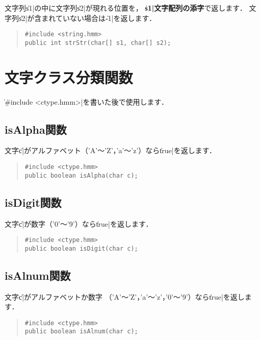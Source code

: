 文字列\|s1|の中に文字列\|s2|が現れる位置を，
{\bf\|s1|文字配列の添字}で返します．
文字列\|s2|が含まれていない場合は\|-1|を返します．

\begin{quote}
\begin{verbatim}
#include <string.hmm>
public int strStr(char[] s1, char[] s2);
\end{verbatim}
\end{quote}

\section{文字クラス分類関数}

\|#include <ctype.hmm>|を書いた後で使用します．

\subsection{isAlpha関数}

文字\|c|がアルファベット（'A'〜'Z'，'a'〜'z'）なら\|true|を返します．

\begin{quote}
\begin{verbatim}
#include <ctype.hmm>
public boolean isAlpha(char c);
\end{verbatim}
\end{quote}

\subsection{isDigit関数}

文字\|c|が数字（'0'〜'9'）なら\|true|を返します．

\begin{quote}
\begin{verbatim}
#include <ctype.hmm>
public boolean isDigit(char c);
\end{verbatim}
\end{quote}

\subsection{isAlnum関数}

文字\|c|がアルファベットか数字
（'A'〜'Z'，'a'〜'z'，'0'〜'9'）なら\|true|を返します．

\begin{quote}
\begin{verbatim}
#include <ctype.hmm>
public boolean isAlnum(char c);
\end{verbatim}
\end{quote}

